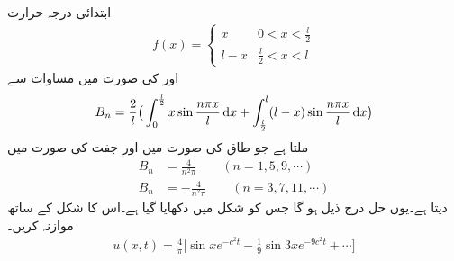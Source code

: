 ابتدائی درجہ حرارت 
\begin{align*}
f(x)=
\begin{cases}
x&0<x<\frac{l}{2}\\
l-x&\frac{l}{2}<x<l
\end{cases}
\end{align*}
اور  کی صورت میں مساوات  سے
\begin{align}
B_n=\frac{2}{l}\big(\int_0^{\frac{l}{2}}x\sin \frac{n\pi x}{l}\dif x+\int_{\frac{l}{2}}^{l} (l-x)\sin\frac{n\pi x}{l}\dif x\big)
\end{align}
ملتا ہے جو طاق  کی صورت میں  اور جفت  کی صورت میں
\begin{align*}
B_n&=\frac{4}{n^2\pi}\quad \quad (n=1,5,9,\cdots)\\
B_n&=-\frac{4}{n^2\pi}\quad \quad (n=3,7,11,\cdots)
\end{align*}
دیتا ہے۔یوں حل درج ذیل ہو گا جس کو شکل  میں دکھایا گیا ہے۔اس کا  شکل  کے ساتھ موازنہ کریں۔
\begin{align*}
u(x,t)=\frac{4}{\pi}\big[\sin x e^{-c^2t}-\frac{1}{9}\sin 3x e^{-9c^2t}+\cdots\big]
\end{align*}
%
